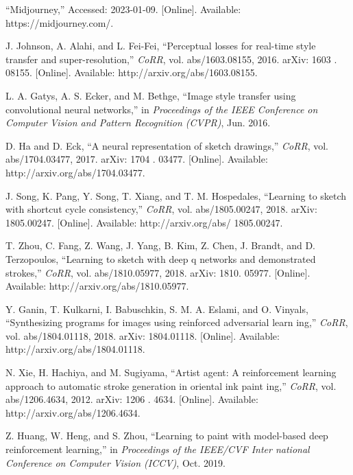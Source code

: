 \documentclass{mva_style}
\begin{document}
\begin{thebibliography}{99}

“Midjourney,” Accessed: 2023-01-09. [Online]. Available: https://midjourney.com/.

\sloppy
J. Johnson, A. Alahi, and L. Fei-Fei, “Perceptual losses for real-time
style transfer and super-resolution,” \textit{CoRR}, vol. abs/1603.08155, 2016.
arXiv: 1603 . 08155. [Online]. Available: http://arxiv.org/abs/1603.08155.

L. A. Gatys, A. S. Ecker, and M. Bethge, “Image style transfer using
convolutional neural networks,” in \textit{Proceedings of the IEEE Conference
on Computer Vision and Pattern Recognition (CVPR)}, Jun. 2016.

\sloppy
D. Ha and D. Eck, “A neural representation of sketch drawings,” \textit{CoRR},
vol. abs/1704.03477, 2017. arXiv: 1704 . 03477. [Online]. Available:
http://arxiv.org/abs/1704.03477.

J. Song, K. Pang, Y. Song, T. Xiang, and T. M. Hospedales, “Learning
to sketch with shortcut cycle consistency,” \textit{CoRR}, vol. abs/1805.00247,
2018. arXiv: 1805.00247. [Online]. Available: http://arxiv.org/abs/
1805.00247.

T. Zhou, C. Fang, Z. Wang, J. Yang, B. Kim, Z. Chen, J. Brandt,
and D. Terzopoulos, “Learning to sketch with deep q networks and
demonstrated strokes,” \textit{CoRR}, vol. abs/1810.05977, 2018. arXiv: 1810.
05977. [Online]. Available: http://arxiv.org/abs/1810.05977.

Y. Ganin, T. Kulkarni, I. Babuschkin, S. M. A. Eslami, and O. Vinyals,
“Synthesizing programs for images using reinforced adversarial learn
ing,” \textit{CoRR}, vol. abs/1804.01118, 2018. arXiv: 1804.01118. [Online].
Available: http://arxiv.org/abs/1804.01118.

N. Xie, H. Hachiya, and M. Sugiyama, “Artist agent: A reinforcement
learning approach to automatic stroke generation in oriental ink paint
ing,” \textit{CoRR}, vol. abs/1206.4634, 2012. arXiv: 1206 . 4634. [Online].
Available: http://arxiv.org/abs/1206.4634.

Z. Huang, W. Heng, and S. Zhou, “Learning to paint with model-based
deep reinforcement learning,” in \textit{Proceedings of the IEEE/CVF Inter
national Conference on Computer Vision (ICCV)}, Oct. 2019.


\end{thebibliography}
\end{document}
